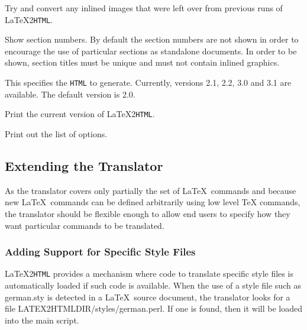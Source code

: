 \documentclass[dvips]{article}
\newcommand{\latextohtml}{\LaTeX 2\texttt{HTML}}
\newcommand{\fn}[1]{{\ttfamily #1}}	%
\begin{document}
\begin{htmllist}
Try and convert any inlined images that were left over from previous
runs of \latextohtml. 
\item [ -show$\_$section$\_$numbers]
Show section numbers. By default the section numbers are not shown 
in order to encourage the 
use of particular sections as standalone documents. 
In order to be shown, section titles must be unique and must not
contain inlined graphics.
\item [ -html\_version \textsl{version}]
This specifies the \texttt{HTML} 
to generate.  Currently, versions 2.1, 2.2, 3.0 and 3.1 are
available.  The default version is 2.0.
\begin{changebar}
\item [ -vs] Print the current version of \latextohtml.
\end{changebar}
\item [-h]
Print out the list of options.
\end{htmllist}

\subsection{Extending the Translator}
\label{sec:extend}
As the translator covers only partially the set of \LaTeX\  commands
and
because new \LaTeX\  commands can be defined arbitrarily using low level 
TeX commands, the translator should be flexible enough to allow end
users
to specify how they want particular commands to be translated. 

\subsubsection{Adding Support for Specific Style Files}
\label{sec:sty}
\latextohtml{} provides a mechanism where code to translate specific
style files is automatically loaded if such code is available.
When the use of a style
file such as \fn{german.sty} is detected in a \LaTeX\  source
document,
the translator looks for a file \fn{LATEX2HTMLDIR/styles/german.perl}.
If one is found, then it will be loaded into the main script. 
\end{document}
